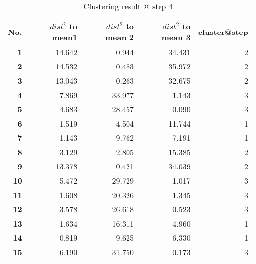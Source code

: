\begin{table}[htbp]
  \centering
  \caption{Clustering result @ step 4}
    \begin{tabular}{rrrrr}
    \toprule
    \textbf{No.} & \textbf{$dist^2$ to mean1} & \textbf{$dist^2$ to mean 2} & \textbf{$dist^2$ to mean 3} & \textbf{cluster@step} \\
    \midrule
    \textbf{1} & 14.642  & 0.944  & 34.431  & 2 \\
    \textbf{2} & 14.532  & 0.483  & 35.972  & 2 \\
    \textbf{3} & 13.043  & 0.263  & 32.675  & 2 \\
    \textbf{4} & 7.869  & 33.977  & 1.143  & 3 \\
    \textbf{5} & 4.683  & 28.457  & 0.090  & 3 \\
    \textbf{6} & 1.519  & 4.504  & 11.744  & 1 \\
    \textbf{7} & 1.143  & 9.762  & 7.191  & 1 \\
    \textbf{8} & 3.129  & 2.805  & 15.385  & 2 \\
    \textbf{9} & 13.378  & 0.421  & 34.039  & 2 \\
    \textbf{10} & 5.472  & 29.729  & 1.017  & 3 \\
    \textbf{11} & 1.608  & 20.326  & 1.345  & 3 \\
    \textbf{12} & 3.578  & 26.618  & 0.523  & 3 \\
    \textbf{13} & 1.634  & 16.311  & 4.960  & 1 \\
    \textbf{14} & 0.819  & 9.625  & 6.330  & 1 \\
    \textbf{15} & 6.190  & 31.750  & 0.173  & 3 \\
    \bottomrule
    \end{tabular}%
  \label{tab:cluster_b4}%
\end{table}%
